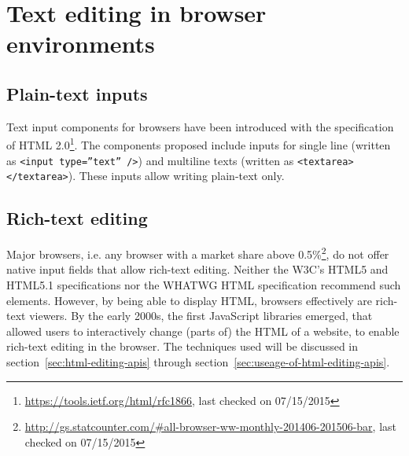\chapter{Text editing in browser environments}


\section{Plain-text inputs}

Text input components for browsers have been introduced with the specification of HTML 2.0\footnote{\url{https://tools.ietf.org/html/rfc1866}, last checked on 07/15/2015}. The components proposed include inputs for single line (written as \texttt{<input type=''text'' />}) and multiline texts (written as \texttt{<textarea></textarea>}). These inputs allow writing plain-text only.


\section{Rich-text editing}

Major browsers, i.e. any browser with a market share above 0.5\%\footnote{\url{http://gs.statcounter.com/#all-browser-ww-monthly-201406-201506-bar}, last checked on 07/15/2015}, do not offer native input fields that allow rich-text editing. Neither the W3C's HTML5 and HTML5.1 specifications nor the WHATWG HTML specification recommend such elements. However, by being able to display HTML, browsers effectively are rich-text viewers. By the early 2000s, the first JavaScript libraries emerged, that allowed users to interactively change (parts of) the HTML of a website, to enable rich-text editing in the browser. The techniques used will be discussed in section~\ref{sec:html-editing-apis} through section~\ref{sec:useage-of-html-editing-apis}.

